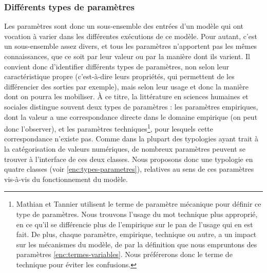 \subsubsection{Différents types de paramètres}

Les paramètres sont donc un sous-ensemble des entrées d'un modèle qui ont vocation à varier dans les différentes exécutions de ce modèle.
Pour autant, c'est un sous-ensemble assez divers, et tous les paramètres n'apportent pas les mêmes connaissances, que ce soit par leur valeur ou par la manière dont ils varient.
Il convient donc d'identifier différents types de paramètres, non selon leur caractéristique propre (c'est-à-dire leurs propriétés, qui permettent de les différencier des sorties par exemple), mais selon leur usage et donc la manière dont on pourra les mobiliser.
À ce titre, la littérature en sciences humaines et sociales
distingue souvent deux types de paramètres :
	les paramètres empiriques, dont la valeur a une correspondance directe dans le domaine empirique (on peut donc l'observer), et les paramètres techniques\footnote{
		Mathian et Tannier \autocite{mathian_formalisation_2015} utilisent le terme de paramètre mécanique pour définir ce type de paramètres.
		Nous trouvons l'usage du mot \og technique\fg{} plus approprié, en ce qu'il se différencie plus de l'empirique sur le pan de l'usage qui en est fait.
		De plus, chaque paramètre, empirique, technique ou autre, a un impact sur les mécanismes du modèle, de par la définition que nous empruntons des paramètres \cref{enc:termes-variables}.
		Nous préférerons donc le terme de \og technique\fg{} pour éviter les confusions.
	}, pour lesquels cette correspondance n'existe pas.
Comme dans la plupart des typologies ayant trait à la catégorisation de valeurs numériques, de nombreux paramètres peuvent se trouver à l'interface de ces deux classes.
Nous proposons donc une typologie en quatre classes (voir \cref{enc:types-parametres}), relatives au sens de ces paramètres vis-à-vis du fonctionnement du modèle.

